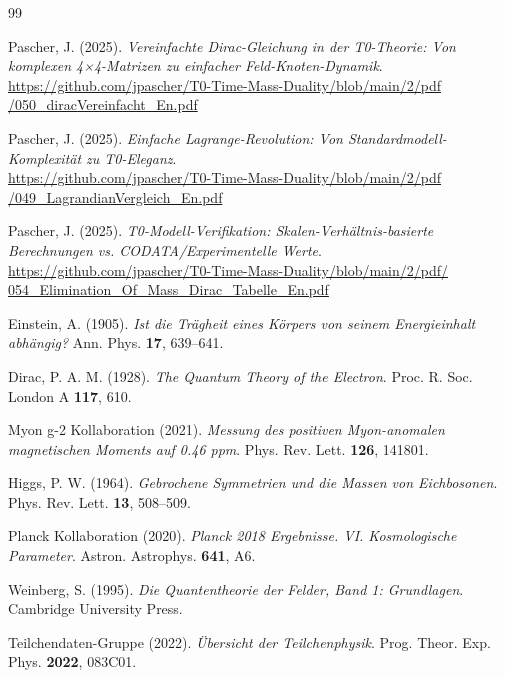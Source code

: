 \begin{thebibliography}{99}
	
	Pascher, J. (2025). \textit{Vereinfachte Dirac-Gleichung in der T0-Theorie: Von komplexen 4×4-Matrizen zu einfacher Feld-Knoten-Dynamik}. \\
	\href{https://github.com/jpascher/T0-Time-Mass-Duality/blob/main/2/pdf/050_diracVereinfacht_En.pdf}{https://github.com/jpascher/T0-Time-Mass-Duality/blob/main/2/pdf\\/050\_diracVereinfacht\_En.pdf}
	
	Pascher, J. (2025). \textit{Einfache Lagrange-Revolution: Von Standardmodell-Komplexität zu T0-Eleganz}. \\
	\href{https://github.com/jpascher/T0-Time-Mass-Duality/blob/main/2/pdf/049_LagrandianVergleich_En.pdf}{https://github.com/jpascher/T0-Time-Mass-Duality/blob/main/2/pdf\\/049\_LagrandianVergleich\_En.pdf}
	
	Pascher, J. (2025). \textit{T0-Modell-Verifikation: Skalen-Verhältnis-basierte Berechnungen vs. CODATA/Experimentelle Werte}. \\
	\href{https://github.com/jpascher/T0-Time-Mass-Duality/blob/main/2/pdf/054_Elimination_Of_Mass_Dirac_Tabelle_En.pdf}{https://github.com/jpascher/T0-Time-Mass-Duality/blob/main/2/pdf/\\054\_Elimination\_Of\_Mass\_Dirac\_Tabelle\_En.pdf}
	
	Einstein, A. (1905). \textit{Ist die Trägheit eines Körpers von seinem Energieinhalt abhängig?} Ann. Phys. \textbf{17}, 639--641.
	
	Dirac, P. A. M. (1928). \textit{The Quantum Theory of the Electron}. Proc. R. Soc. London A \textbf{117}, 610.
	
	Myon g-2 Kollaboration (2021). \textit{Messung des positiven Myon-anomalen magnetischen Moments auf 0.46 ppm}. Phys. Rev. Lett. \textbf{126}, 141801.
	
	Higgs, P. W. (1964). \textit{Gebrochene Symmetrien und die Massen von Eichbosonen}. Phys. Rev. Lett. \textbf{13}, 508--509.
	
	Planck Kollaboration (2020). \textit{Planck 2018 Ergebnisse. VI. Kosmologische Parameter}. Astron. Astrophys. \textbf{641}, A6.
	
	Weinberg, S. (1995). \textit{Die Quantentheorie der Felder, Band 1: Grundlagen}. Cambridge University Press.
	
	Teilchendaten-Gruppe (2022). \textit{Übersicht der Teilchenphysik}. Prog. Theor. Exp. Phys. \textbf{2022}, 083C01.
	
\end{thebibliography}